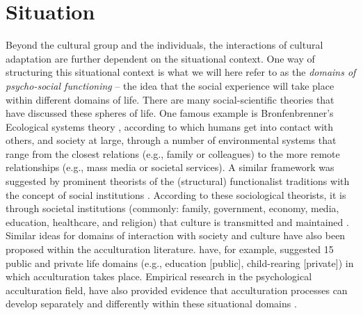 \documentclass[man, 12pt, a4paper]{apa7}
\begin{document}
\section{Situation} 
Beyond the cultural group and the individuals, the interactions of cultural adaptation are further dependent on the situational context. One way of structuring this situational context is what we will here refer to as the \textit{domains of psycho-social functioning} -- the idea that the social experience will take place within different domains of life. There are many social-scientific theories that have discussed these spheres of life. One famous example is Bronfenbrenner's Ecological systems theory \citep{Bronfenbrenner1992}, according to which humans get into contact with others, and society at large, through a number of environmental systems that range from the closest relations (e.g., family or colleagues) to the more remote relationships (e.g., mass media or societal services). A similar framework was suggested by prominent theorists of the (structural) functionalist traditions with the concept of social institutions \citep[e.g.,][]{Turner1997}. According to these sociological theorists, it is through societal institutions (commonly: family, government, economy, media, education, healthcare, and religion) that culture is transmitted and maintained \citep[e.g.,][]{Durkheim1982}. Similar ideas for domains of interaction with society and culture have also been proposed within the acculturation literature. \citet{Arends-Toth2006, Arends-Toth2007} have, for example, suggested 15 public and private life domains (e.g., education [public], child-rearing [private]) in which acculturation takes place. Empirical research in the psychological acculturation field, have also provided evidence that acculturation processes can develop separately and differently within these situational domains \citep[e.g.,][]{Arends-Toth2003a}. 
\end{document}

